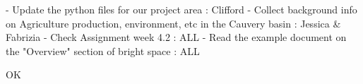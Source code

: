 - Update the python files for our project area : Clifford
- Collect background info on Agriculture production, environment, etc in the Cauvery basin : Jessica & Fabrizia
- Check Assignment week 4.2  : ALL
- Read the example document on the "Overview" section of bright space : ALL


OK